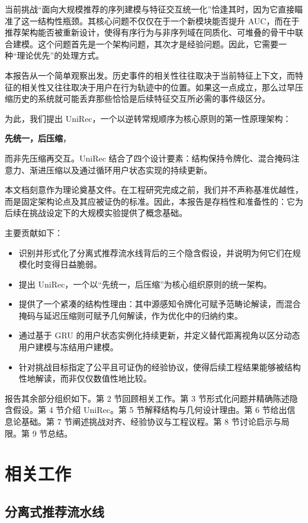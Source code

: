 \documentclass{article}
\begin{document}
当前挑战“面向大规模推荐的序列建模与特征交互统一化”恰逢其时，因为它直接瞄准了这一结构性瓶颈。其核心问题不仅仅在于一个新模块能否提升 AUC，而在于推荐架构能否被重新设计，使得有序行为与非序列域在同质化、可堆叠的骨干中联合建模。这个问题首先是一个架构问题，其次才是经验问题。因此，它需要一种“理论优先”的处理方式。

本报告从一个简单观察出发。历史事件的相关性往往取决于当前特征上下文，而特征的相关性又往往取决于用户在行为轨迹中的位置。如果这一点成立，那么过早压缩历史的系统就可能丢弃那些恰恰是后续特征交互所必需的事件级区分。

为此，我们提出 UniRec，一个以逆转常规顺序为核心原则的第一性原理架构：

\textbf{先统一，后压缩}，

而非先压缩再交互。UniRec 结合了四个设计要素：结构保持令牌化、混合掩码注意力、渐进压缩以及通过循环用户状态实现的持续更新。

本文档刻意作为理论奠基文件。在工程研究完成之前，我们并不声称基准优越性，而是固定架构论点及其应被证伪的标准。因此，本报告是存档性和准备性的：它为后续在挑战设定下的大规模实验提供了概念基础。

主要贡献如下：

\begin{itemize}
\item 识别并形式化了分离式推荐流水线背后的三个隐含假设，并说明为何它们在规模化时变得日益脆弱。
\item 提出 UniRec，一个以“先统一，后压缩”为核心组织原则的统一架构。
\item 提供了一个紧凑的结构性理由：其中源感知令牌化可赋予范畴论解读，而混合掩码与延迟压缩则可赋予几何解读，作为优化中的归纳约束。
\item 通过基于 GRU 的用户状态实例化持续更新，并定义替代距离视角以区分动态用户建模与冻结用户建模。
\item 针对挑战目标指定了公平且可证伪的经验协议，使得后续工程结果能够被结构性地解读，而非仅仅数值性地比较。
\end{itemize}

报告其余部分组织如下。第 2 节回顾相关工作。第 3 节形式化问题并精确陈述隐含假设。第 4 节介绍 UniRec。第 5 节解释结构与几何设计理由。第 6 节给出信息论基础。第 7 节阐述挑战对齐、经验协议与工程议程。第 8 节讨论启示与局限。第 9 节总结。

\section{相关工作}

\subsection{分离式推荐流水线}
\end{document}
